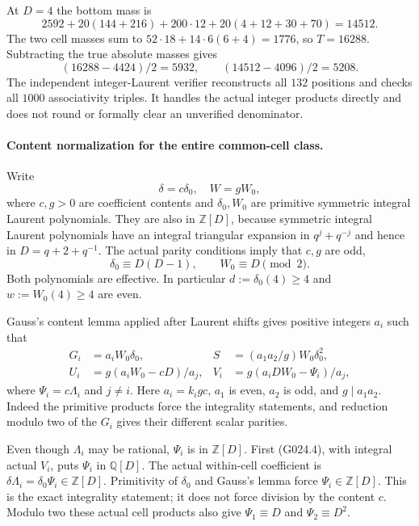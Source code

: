 At $D=4$ the bottom mass is
\[
 2592+20(144+216)+200\cdot12+20(4+12+30+70)=14512.
\]
The two cell masses sum to
$52\cdot18+14\cdot6(6+4)=1776$, so $T=16288$.
Subtracting the true absolute masses gives
\[
 (16288-4424)/2=5932,\qquad (14512-4096)/2=5208.
 \tag{G024.3}
\]
The independent integer-Laurent verifier
 reconstructs all $132$
positions and checks all $1000$ associativity triples. It
handles the actual integer products directly and does not
round or formally clear an unverified denominator.

\paragraph{Content normalization for the entire common-cell class.}
Write
\[
 \delta=c\delta_0,\quad W=gW_0,
\]
where $c,g>0$ are coefficient contents and $\delta_0,W_0$
are primitive symmetric integral Laurent polynomials.
They are also in $\mathbb Z[D]$, because symmetric integral
Laurent polynomials have an integral triangular expansion
in $q^j+q^{-j}$ and hence in $D=q+2+q^{-1}$.
The actual parity conditions imply that $c,g$ are odd,
\[
 \delta_0\equiv D(D-1),\qquad W_0\equiv D\pmod2.
\]
Both polynomials are effective. In particular
$d:=\delta_0(4)\ge4$ and $w:=W_0(4)\ge4$ are even.

Gauss's content lemma applied after Laurent shifts gives
positive integers $a_i$ such that
\[
 \begin{aligned}
 G_i&=a_iW_0\delta_0,&
 S&=(a_1a_2/g)W_0\delta_0^2,\\
 U_i&=g(a_iW_0-cD)/a_j,&
 V_i&=g(a_iDW_0-\Psi_i)/a_j,
 \end{aligned}                                                     \tag{G024.4}
\]
where $\Psi_i=c\Lambda_i$ and $j\ne i$.
Here $a_i=k_i g c$, $a_1$ is even, $a_2$ is odd, and
$g\mid a_1a_2$. Indeed the primitive products force the
integrality statements, and reduction modulo two of the
$G_i$ gives their different scalar parities.

Even though $\Lambda_i$ may be rational, $\Psi_i$ is in
$\mathbb Z[D]$. First (G024.4), with integral actual $V_i$,
puts $\Psi_i$ in $\mathbb Q[D]$. The actual within-cell
coefficient is $\delta\Lambda_i=\delta_0\Psi_i\in\mathbb Z[D]$.
Primitivity of $\delta_0$ and Gauss's lemma force
$\Psi_i\in\mathbb Z[D]$. This is the exact integrality
statement; it does not force division by the content $c$.
Modulo two these actual cell products also give
$\Psi_1\equiv D$ and $\Psi_2\equiv D^2$.

